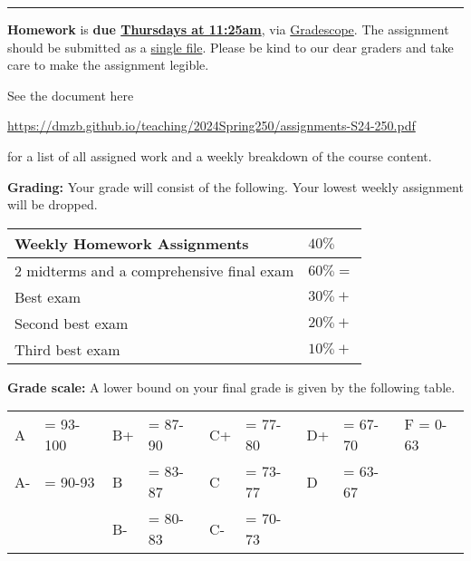 \documentclass[12pt]{article}
\begin{document}
\smallskip \hrule \medskip
\noindent \textbf{Homework} is \textbf{due \underline{Thursdays at 11:25am}}, via \underline{Gradescope}. The assignment should be submitted as a \underline{single file}. Please be kind to our dear graders and take care to make the assignment legible.
\smallskip

\noindent See the document here
\begin{center}
 \url{https://dmzb.github.io/teaching/2024Spring250/assignments-S24-250.pdf}
\end{center}
for a list of all assigned work and a weekly breakdown of the course content.
\medskip

\newpage
\noindent\textbf{Grading:}
Your grade will consist of the following. Your lowest weekly assignment will be dropped.

\begin{center}
 \begin{tabular}{|l|l|}
 \hline
 Weekly Homework Assignments & $40\%$ \\
 \hline
 2 midterms and a comprehensive final exam & $60\% = $ 	 \\
 Best exam & $30\% + $ 	 \\
 Second best exam& $20\% + $ 	 \\
 Third best exam & $10\% + $ 	 \\
 \hline
 \end{tabular}
\end{center}

\vspace*{.15in}
\noindent\textbf{Grade scale:}
A lower bound on your final grade is given by the following table.

\begin{center}
 \begin{tabular}{|ll|ll|ll|ll|l|}
\hline
A &\hspace{-3 pt}\hspace{-7 pt}= 93-100 &B+ &\hspace{-7 pt}= 87-90 &C+ &\hspace{-7 pt}= 77-80 & D+ &\hspace{-7 pt}= 67-70 & F = 0-63\\
A- &\hspace{-3 pt}\hspace{-7 pt}= 90-93 &B &\hspace{-7 pt}= 83-87 & C &\hspace{-7 pt}= 73-77 & D &\hspace{-7 pt}= 63-67 &\\
 & &B- &\hspace{-7 pt}= 80-83 &C- &\hspace{-7 pt}= 70-73 & & &\\
 \hline
 \end{tabular}
\end{center}
\end{document}
